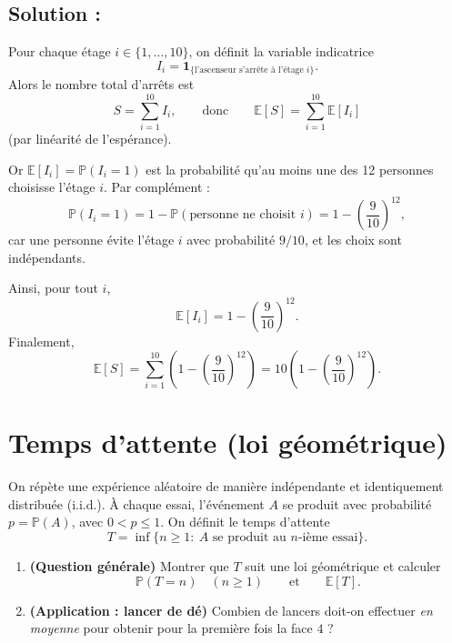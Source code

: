 \subsection*{Solution :}

Pour chaque étage $i\in\{1,\dots,10\}$, on définit la variable indicatrice
\[
I_i=\mathbf{1}_{\{\text{l'ascenseur s'arrête à l'étage } i\}}.
\]
Alors le nombre total d'arrêts est
\[
S=\sum_{i=1}^{10} I_i,
\qquad\text{donc}\qquad
\mathbb{E}[S]=\sum_{i=1}^{10}\mathbb{E}[I_i]
\]
(par linéarité de l'espérance).

Or $\mathbb{E}[I_i]=\mathbb{P}(I_i=1)$ est la probabilité qu'au moins une des 12 personnes choisisse
l'étage $i$. Par complément :
\[
\mathbb{P}(I_i=1)=1-\mathbb{P}(\text{personne ne choisit } i)
=1-\left(\frac{9}{10}\right)^{12},
\]
car une personne évite l'étage $i$ avec probabilité $9/10$, et les choix sont indépendants.

Ainsi, pour tout $i$,
\[
\mathbb{E}[I_i]=1-\left(\frac{9}{10}\right)^{12}.
\]
Finalement,
\[
\boxed{
\mathbb{E}[S]
=
\sum_{i=1}^{10}\left(1-\left(\frac{9}{10}\right)^{12}\right)
=
10\left(1-\left(\frac{9}{10}\right)^{12}\right).
}
\]

\section{Temps d'attente (loi géométrique)}


\begin{exerciseBox}
On répète une expérience aléatoire de manière indépendante et identiquement distribuée (i.i.d.).
À chaque essai, l'événement $A$ se produit avec probabilité $p=\mathbb{P}(A)$, avec $0<p\le 1$.
On définit le temps d'attente
\[
T=\inf\{n\ge 1:\ \text{$A$ se produit au $n$-ième essai}\}.
\]

\begin{enumerate}
\item \textbf{(Question générale)} Montrer que $T$ suit une loi géométrique et calculer
\[
\mathbb{P}(T=n)\quad (n\ge 1)
\qquad\text{et}\qquad
\mathbb{E}[T].
\]


\item \textbf{(Application : lancer de dé)}  
Combien de lancers doit-on effectuer \emph{en moyenne} pour obtenir pour la première fois la face $4$ ?

\end{enumerate}
\end{exerciseBox}


